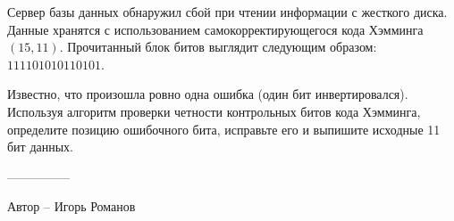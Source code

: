 \question
Сервер базы данных обнаружил сбой при чтении информации с жесткого диска. Данные хранятся с использованием самокорректирующегося кода Хэмминга $(15,11)$. Прочитанный блок битов выглядит следующим образом: $111101010110101$.

Известно, что произошла ровно одна ошибка (один бит инвертировался). Используя алгоритм проверки четности контрольных битов кода Хэмминга, определите позицию ошибочного бита, исправьте его и выпишите исходные 11 бит данных.

---------------

Автор -- Игорь Романов
